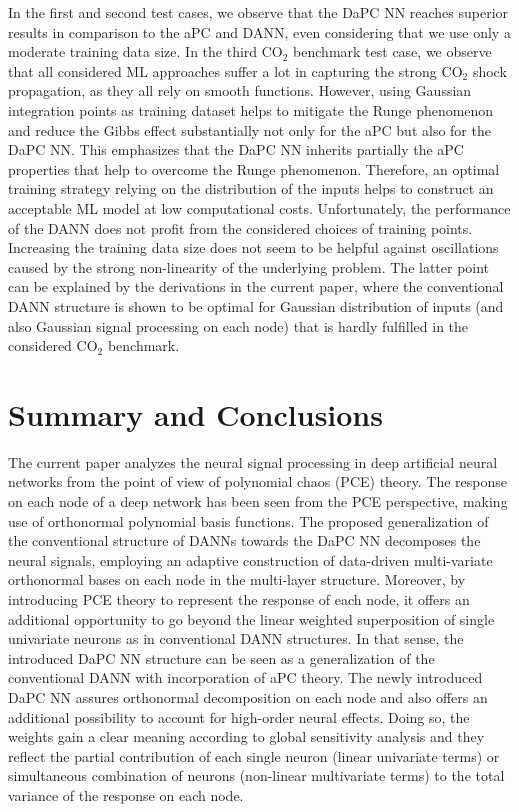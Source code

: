 \documentclass[a4paper,fleqn]{article}
\newcommand{\rw}[1]{\textcolor{blue}{#1}}
\newcommand{\del}[1]{\textcolor{red}{\sout{#1}}}
\renewcommand{\del}[1]{}
\renewcommand{\rw}[1]{#1}
\begin{document}
In the first and second test cases, we observe that the DaPC NN reaches superior results in comparison to the aPC and DANN, even considering that we use only a moderate training data size. In the third CO$_2$ benchmark test case, we observe that all considered ML approaches suffer a lot in capturing the strong CO$_2$ shock propagation, as they all rely on smooth functions. However, using Gaussian integration points as training dataset helps to mitigate the Runge phenomenon and reduce the Gibbs effect substantially \del{not-only} \rw{not only} for the aPC but also for the DaPC NN. This emphasizes that the DaPC NN inherits partially the aPC properties that help to overcome the Runge phenomenon. Therefore, an optimal training strategy relying on the distribution of the inputs helps to construct an acceptable ML model at low computational costs.  Unfortunately, the performance of the DANN does not profit from the considered choices of training points. Increasing the training data size does not seem to be helpful against oscillations caused by the strong non-linearity of the underlying problem. The latter point can be explained by the derivations in the current paper, where the conventional DANN structure is shown to be optimal for Gaussian distribution of inputs (and also Gaussian signal processing on each node) that is hardly fulfilled in the considered CO$_2$ benchmark.


\section*{Summary and Conclusions}
The current paper analyzes the neural signal processing in deep artificial neural networks from the point of view of polynomial chaos (PCE) theory. The response on each node of a deep network has been seen from the PCE perspective, making use of orthonormal polynomial basis functions. The proposed generalization of the conventional structure of DANNs towards the DaPC NN decomposes the neural signals, employing an adaptive construction of data-driven multi-variate orthonormal bases on each node in the multi-layer structure. Moreover, by introducing PCE theory to represent the response of each node, it offers an additional opportunity to go beyond the linear weighted superposition of single \rw{univariate} neurons as in conventional DANN structures. In that sense, the introduced DaPC NN structure can be seen as a generalization of the conventional DANN with incorporation of aPC theory. The newly introduced DaPC NN assures orthonormal decomposition on each node and also offers an additional possibility to account for high-order neural effects. Doing so, the weights gain a clear meaning according to global sensitivity analysis and they reflect the partial contribution of each single neuron (linear \rw{univariate} terms) or simultaneous combination of neurons (non-linear \rw{multivariate} terms) to the total variance of the response on each node.
\end{document}
